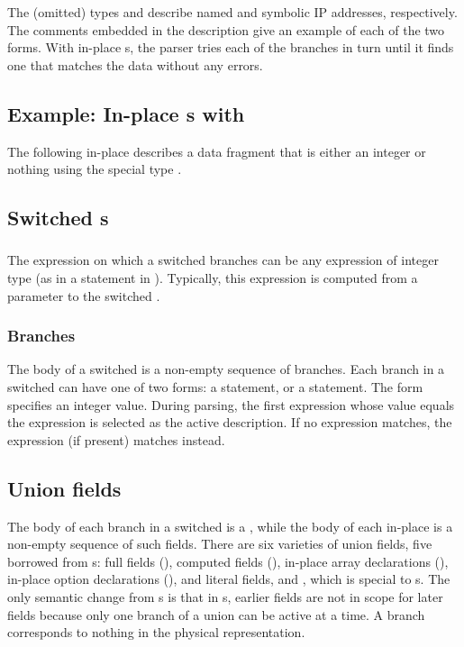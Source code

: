 %
\noindent
The (omitted) types  and  describe named and symbolic
IP addresses, respectively.
The comments embedded in the description give an example of each of the two
forms.   With in-place \Punion{}s, the parser tries each of the branches
in turn until it finds one that matches the data without any errors.

\subsection{Example: In-place \Punion{}s with \Pempty{}}
The following in-place \Punion{} describes a data fragment that is
either an integer or nothing using the special type \Pempty{}.

%
\noindent

\subsection{Switched \Punion{}s}
\subsubsection{\Pswitch{}}
The expression on which a switched \Punion{} branches can be any \C{}
expression of integer type (as in a  statement in \C{}).
Typically, this expression is computed from a parameter to the
switched \Punion{}.

\subsubsection{Branches}
The body of a switched \Punion{} is a non-empty sequence of branches.
Each branch in a switched \Punion{} can have one of two forms: a
\Pcase{} statement, or a \Pdefault{} statement.  The \Pcase{} form
specifies an integer value.  During parsing, the first \Pcase{}
expression whose value equals the \Pswitch{} expression is selected as
the active description. If no \Pcase{} expression
matches, the \Pdefault{} expression (if present) matches instead.

\subsection{Union fields}
The body of each branch in a switched \Punion{} is a ,
while the body of each in-place \Punion{} is a non-empty sequence of
such fields. 
There are six varieties of union fields, five borrowed from \Pstruct{}s: 
full fields (),
computed fields (), 
in-place array declarations (),
in-place option declarations (),
and literal fields, and \Pempty{}, which is special to \Punion{}s.
The only semantic change from \Pstruct{}s  is
that in \Punion{}s, earlier fields are not in scope for later fields
because only one branch of a union can be active at a time.  A
\Pempty{} branch corresponds to nothing in the physical representation.

